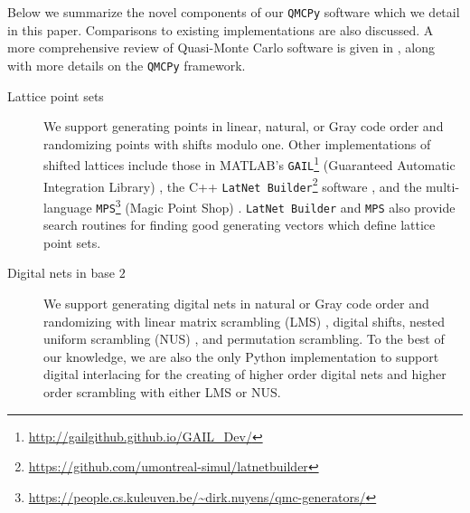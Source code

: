 \documentclass[acmsmall]{acmart}
\begin{document}
Below we summarize the novel components of our \texttt{QMCPy} software which we detail in this paper. Comparisons to existing implementations are also discussed. A more comprehensive review of Quasi-Monte Carlo software is given in \citep{choi.QMC_software}, along with more details on the \texttt{QMCPy} framework. 
\begin{description}
    \item[Lattice point sets] We support generating points in linear, natural, or Gray code order and randomizing points with shifts modulo one. Other implementations of shifted lattices include those in MATLAB's \texttt{GAIL}\footnote{\url{http://gailgithub.github.io/GAIL_Dev/}} (Guaranteed Automatic Integration Library) \citep{GAIL.software,hickernell2018monte}, the C++ \texttt{LatNet Builder}\footnote{\url{https://github.com/umontreal-simul/latnetbuilder}} software \citep{LatNetBuilder.software}, and the multi-language \texttt{MPS}\footnote{\url{https://people.cs.kuleuven.be/~dirk.nuyens/qmc-generators/}} (Magic Point Shop) \citep{MagicPointShop.software}. \texttt{LatNet Builder} and \texttt{MPS} also provide search routines for finding good generating vectors which define lattice point sets.
    \item[Digital nets in base $2$] We support generating digital nets in natural or Gray code order and randomizing with linear matrix scrambling (LMS) \citep{owen.variance_alternative_scrambles_digital_net}, digital shifts, nested uniform scrambling (NUS) \citep{owen1995randomly}, and permutation scrambling. To the best of our knowledge, we are also the only Python implementation to support digital interlacing for the creating of higher order digital nets and higher order scrambling with either LMS or NUS. 
    

\end{description}
\end{document}
